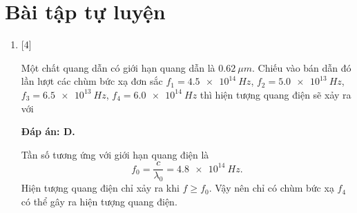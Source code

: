 \section{Bài tập tự luyện}
\begin{enumerate}[label=\bfseries Câu \arabic*:]
	
	\item {} [4]
	\cauhoi
	{Một chất quang dẫn có giới hạn quang dẫn là $\SI{0,62}{\mu m}$. Chiếu vào bán dẫn đó lần lượt các chùm bức xạ đơn sắc $f_{1} = \SI{4,5e14}{Hz}$, $f_{2} = \SI{5,0e13}{Hz}$, $f_{3} = \SI{6,5e13}{Hz}$, $f_4 = \SI{6,0e14}{Hz}$ thì hiện tượng quang điện sẽ xảy ra với
	}
	
	\loigiai
	{		\textbf{Đáp án: D.}
		
		Tần số tương ứng với giới hạn quang điện là
		$$
		f_{0} = \dfrac{c}{\lambda_{0}} = \SI{4,8e14}{Hz}.
		$$
		Hiện tượng quang điện chỉ xảy ra khi $f \geq f_{0}$. Vậy nên chỉ có chùm bức xạ $f_{4}$ có thể gây ra hiện tượng quang điện.
	}
	
	
\end{enumerate}


